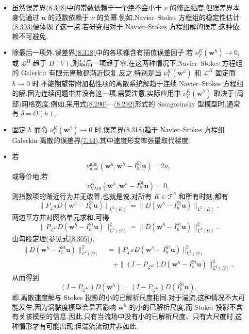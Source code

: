 \begin{note}[关于误差估计(8.318)]
\label{note:vms-coarse-projection-error-estimate}
\begin{itemize}
 \item 虽然误差界\hyperref[eq:vms-coarse-projection-error-estimate]{(8.318)}中的常数依赖于一个绝不会小于 $\nu$ 的修正黏度,但误差界本身仍通过 $\bm u$ 的范数依赖于 $\nu$ 的负幂.例如,Navier--Stokes 方程组的稳定性估计\hyperref[eq:vms-coarse-projection-continuous-stability]{(8.303)}便体现了这一点.若研究相对于 Navier--Stokes 方程组解的误差,这种依赖不可避免.
 \item 除最后一项外,误差界\hyperref[eq:vms-coarse-projection-error-estimate]{(8.318)}中的各项都含有插值误差因子.若 $\nu_T^K(\bm w^h)\to0$,或 $\mathcal L^H$ 趋于 $D(V)$,则最后一项趋于零.在这两种情况下,Navier--Stokes 方程组的 Galerkin 有限元离散都渐近恢复.反之,特别是当 $\nu_T^K(\bm w^h)$ 和 $\mathcal L^H$ 固定而 $h\to0$ 时,不能期望带附加黏性项的离散系统解趋于连续 Navier--Stokes 方程组的解,因为连续问题中并没有这一项.需要注意,实际应用中 $\nu_T^K(\bm w^h)$ 取决于(局部)网格宽度;例如,采用式\hyperref[eq:vms-coarse-projection-smagorinsky-all]{(8.290)}—\hyperref[eq:vms-coarse-projection-smagorinsky-local]{(8.292)}形式的 Smagorinsky 型模型时,通常有 $\delta=O(h)$.
 \item 固定 $h$ 而令 $\nu_T^K(\bm w^h)\to0$ 时,误差界\hyperref[eq:vms-coarse-projection-error-estimate]{(8.318)}趋于 Navier--Stokes 方程组 Galerkin 离散的误差界\hyperref[eq:time-dependent-fem-velocity-error]{(7.44)},其中速度形变率张量取代梯度.
 \item 若
 \[
   \nu_{\mathrm{mod}}^{\min}(\bm w^h,
      \bm w^h-I_h^{\mathrm{St}}\bm u)=2\nu,
 \]
 或等价地,若
 \[
   \nu_{\mathrm{VMS}}^K(\bm w^h,
      \bm w^h-I_h^{\mathrm{St}}\bm u)=0,
 \]
 则指数项的渐近行为并无改善.也就是说,对所有 $K\in\mathcal T^h$ 和所有时刻,都有
 \[
 \|P_{\mathcal L^H}D(\bm w^h-I_h^{\mathrm{St}}\bm u)\|_{L^2(K)}
 =\|D(\bm w^h-I_h^{\mathrm{St}}\bm u)\|_{L^2(K)}.
 \]
 两边平方并对网格单元求和,可得
 \[
 \|P_{\mathcal L^H}D(\bm w^h-I_h^{\mathrm{St}}\bm u)\|_{L^2(\Omega)}^2
 =\|D(\bm w^h-I_h^{\mathrm{St}}\bm u)\|_{L^2(\Omega)}^2.
 \]
 由勾股定理(参见式\hyperref[eq:vms-coarse-projection-pythagorean-identity]{(8.305)}),
 \[
 \begin{aligned}
 \|D(\bm w^h-I_h^{\mathrm{St}}\bm u)\|_{L^2(\Omega)}^2
 &=\|P_{\mathcal L^H}D(\bm w^h-I_h^{\mathrm{St}}\bm u)\|_{L^2(\Omega)}^2\\
 &\quad+\|(I-P_{\mathcal L^H})D(\bm w^h-I_h^{\mathrm{St}}\bm u)\|_{L^2(\Omega)}^2,
 \end{aligned}
 \]
 从而得到
 \[
 (I-P_{\mathcal L^H})D(\bm w^h)
 =(I-P_{\mathcal L^H})D(I_h^{\mathrm{St}}\bm u).
 \]
 即,离散速度解与 Stokes 投影的小的已解析尺度相同.对于湍流,这种情况不大可能发生,因为涡黏度模型会显著影响 $\bm w^h$ 的小的已解析尺度,而 Stokes 投影不含有关该模型的信息.因此,只有当流场中没有小的已解析尺度、只有大尺度时,这种情形才有可能出现;但湍流流动并非如此.
\end{itemize}
\end{note}


